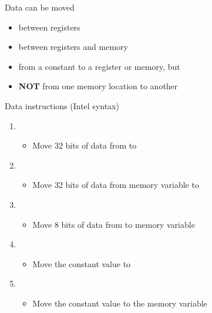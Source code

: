 \begin{frame}
  Data can be moved
  \begin{itemize}
  \item between registers
  \item between registers and memory
  \item from a constant to a register or memory, but
  \item \textbf{NOT} from one memory location to another
  \end{itemize}
  \begin{block}{Data instructions \scriptsize{(Intel syntax)}}
    \begin{enumerate}
    \item {}
      \begin{itemize}
      \item[] {\scriptsize Move 32 bits of data from  to }
      \end{itemize}
    \item {}
      \begin{itemize}
      \item[] {\scriptsize Move 32 bits of data from memory variable  to }
      \end{itemize}
    \item {}
      \begin{itemize}
      \item[] {\scriptsize Move 8 bits of data from  to memory variable }
      \end{itemize}
    \item {}
      \begin{itemize}
      \item[] {\scriptsize Move the constant value  to }
      \end{itemize}
    \item {}
      \begin{itemize}
      \item[] {\scriptsize Move the constant value  to the memory variable
          }
      \end{itemize}
    \end{enumerate}
  \end{block}
\end{frame}


